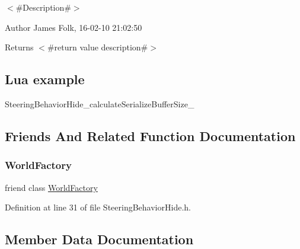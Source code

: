 $<$\#\+Description\#$>$ 

\begin{DoxyAuthor}{Author}
James Folk, 16-\/02-\/10 21\+:02\+:50
\end{DoxyAuthor}
\begin{DoxyReturn}{Returns}
$<$\#return value description\#$>$
\end{DoxyReturn}
\hypertarget{classnjli_1_1_steering_behavior_wander_ex1}{}\subsection{Lua example}\label{classnjli_1_1_steering_behavior_wander_ex1}

\begin{DoxyCodeInclude}
\end{DoxyCodeInclude}
Steering\+Behavior\+Hide\+\_\+calculate\+Serialize\+Buffer\+Size\+\_\+ 

\subsection{Friends And Related Function Documentation}
\mbox{\label{classnjli_1_1_steering_behavior_hide_acb96ebb09abe8f2a37a915a842babfac}} 
\subsubsection{\texorpdfstring{World\+Factory}{WorldFactory}}
{\footnotesize\ttfamily friend class \mbox{\hyperlink{classnjli_1_1_world_factory}{World\+Factory}}\hspace{0.3cm}{\ttfamily [friend]}}



Definition at line 31 of file Steering\+Behavior\+Hide.\+h.



\subsection{Member Data Documentation}
\mbox{\label{classnjli_1_1_steering_behavior_hide_a9d8827a9d2eb8b8cb059f1a920a4cc66}} 
